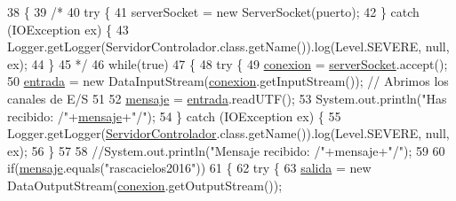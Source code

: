 \begin{DoxyCode}
38                       \{
39         \textcolor{comment}{/*}
40 \textcolor{comment}{        try \{}
41 \textcolor{comment}{            serverSocket = new ServerSocket(puerto);}
42 \textcolor{comment}{        \} catch (IOException ex) \{}
43 \textcolor{comment}{            Logger.getLogger(ServidorControlador.class.getName()).log(Level.SEVERE, null, ex);}
44 \textcolor{comment}{        \}}
45 \textcolor{comment}{        */}
46         \textcolor{keywordflow}{while}(\textcolor{keyword}{true})
47         \{
48             \textcolor{keywordflow}{try} \{
49                 \mbox{\hyperlink{classpecl6part2_1_1_servidor_controlador_a5a4f104c0585b0e66492f05ef7e32510}{conexion}} = \mbox{\hyperlink{classpecl6part2_1_1_servidor_controlador_ac114e889059ed268a9df9f1dc7447f4b}{serverSocket}}.accept();
50                 \mbox{\hyperlink{classpecl6part2_1_1_servidor_controlador_a38528daafe711028fb1bf830801923ba}{entrada}} = \textcolor{keyword}{new} DataInputStream(\mbox{\hyperlink{classpecl6part2_1_1_servidor_controlador_a5a4f104c0585b0e66492f05ef7e32510}{conexion}}.getInputStream());  \textcolor{comment}{// Abrimos los
       canales de E/S}
51                 
52                 \mbox{\hyperlink{classpecl6part2_1_1_servidor_controlador_ac8db190b3104ab20a03976a5411f3bd6}{mensaje}} = \mbox{\hyperlink{classpecl6part2_1_1_servidor_controlador_a38528daafe711028fb1bf830801923ba}{entrada}}.readUTF();
53                 System.out.println(\textcolor{stringliteral}{"Has recibido: /"}+\mbox{\hyperlink{classpecl6part2_1_1_servidor_controlador_ac8db190b3104ab20a03976a5411f3bd6}{mensaje}}+\textcolor{stringliteral}{"/"});
54             \} \textcolor{keywordflow}{catch} (IOException ex) \{
55                 Logger.getLogger(\mbox{\hyperlink{classpecl6part2_1_1_servidor_controlador_a6f49d3d66d33c0f6dc5e7dab2af6766b}{ServidorControlador}}.class.getName()).log(Level.SEVERE, 
      null, ex);
56             \}
57             
58             \textcolor{comment}{//System.out.println("Mensaje recibido: /"+mensaje+"/");}
59             
60             \textcolor{keywordflow}{if}(\mbox{\hyperlink{classpecl6part2_1_1_servidor_controlador_ac8db190b3104ab20a03976a5411f3bd6}{mensaje}}.equals(\textcolor{stringliteral}{"rascacielos2016"}))
61             \{
62                 \textcolor{keywordflow}{try} \{
63                     \mbox{\hyperlink{classpecl6part2_1_1_servidor_controlador_a1a4f0c67b54fa5aa781c1ceafb347e47}{salida}}  = \textcolor{keyword}{new} DataOutputStream(\mbox{\hyperlink{classpecl6part2_1_1_servidor_controlador_a5a4f104c0585b0e66492f05ef7e32510}{conexion}}.getOutputStream());

\end{DoxyCode}
